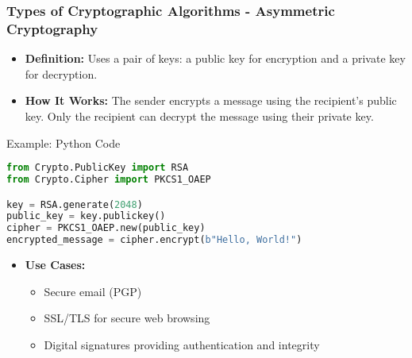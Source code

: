\documentclass{beamer}
\begin{document}
\begin{frame}[fragile]
    \frametitle{Types of Cryptographic Algorithms - Asymmetric Cryptography}
    \begin{itemize}
        \item \textbf{Definition:} 
        Uses a pair of keys: a public key for encryption and a private key for decryption.
        \item \textbf{How It Works:}
        The sender encrypts a message using the recipient's public key.
        Only the recipient can decrypt the message using their private key.
    \end{itemize}

    \begin{block}{Example: Python Code}
    \begin{lstlisting}[language=Python]
from Crypto.PublicKey import RSA
from Crypto.Cipher import PKCS1_OAEP

key = RSA.generate(2048)
public_key = key.publickey()
cipher = PKCS1_OAEP.new(public_key)
encrypted_message = cipher.encrypt(b"Hello, World!")
    \end{lstlisting}
    \end{block}

    \begin{itemize}
        \item \textbf{Use Cases:}
        \begin{itemize}
            \item Secure email (PGP)
            \item SSL/TLS for secure web browsing
            \item Digital signatures providing authentication and integrity
        \end{itemize}
    \end{itemize}
\end{frame}
\end{document}
